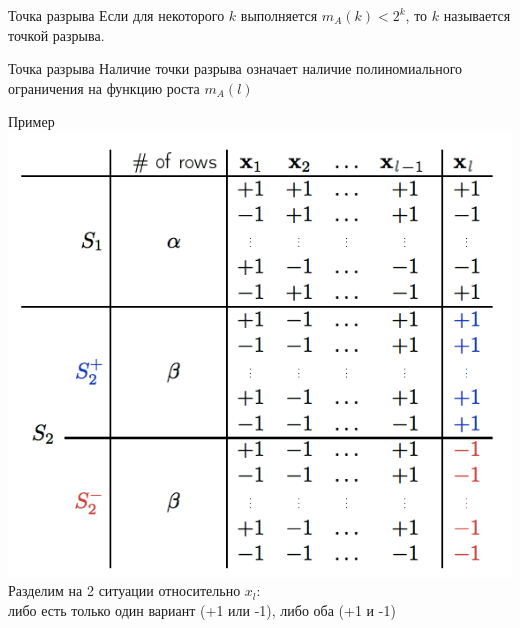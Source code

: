 \documentclass[10pt]{beamer}
\begin{document}

{
\begin{frame}{Точка разрыва}  
  Если для некоторого $k$ выполняется $m_{A}(k) < 2^k$, то $k$ называется точкой разрыва.
\end{frame}
}

\begin{frame}{Точка разрыва}  
  \centering
  Наличие точки разрыва означает наличие полиномиального ограничения на функцию роста $m_{A}(l)$
\end{frame}

\begin{frame}{Пример}  
  \centering
  \includegraphics[width=\textwidth, height=0.8 \textheight, keepaspectratio]{images/breakpoint}\\
  Разделим на 2 ситуации относительно $x_l$: \\либо есть только один вариант (+1 или -1), либо оба (+1 и -1)
\end{frame}
\end{document}
